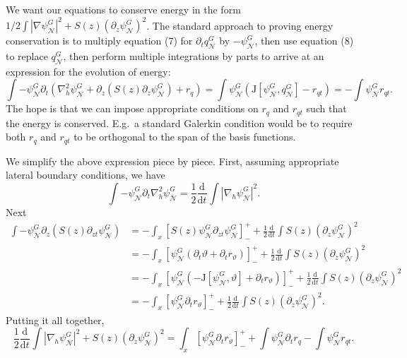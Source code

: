 \documentclass[10pt]{article}
\newcommand{\pd}[1]{\partial_{#1}}
\newcommand{\dd}[3]{\frac{\text{d}^{#3}#1}{\text{d}#2^{#3}}}
\newcommand{\tJ}{\text{J}}
\newcommand{\sN}{\mathcal{N}}
\begin{document}
\clearpage
We want our equations to conserve energy in the form $1/2\int |\nabla\psi_\sN^G|^2+S(z)(\pd{z}\psi_\sN^G)^2$.
The standard approach to proving energy conservation is to multiply equation (7) for $\pd{t}q_\sN^G$ by $-\psi_\sN^G$, then use equation (8) to replace $q_\sN^G$, then perform multiple integrations by parts to arrive at an expression for the evolution of energy:
\[\int-\psi_\sN^G\pd{t}\left(\nabla_h^2\psi_\sN^G + \pd{z}\left(S(z)\pd{z}\psi_\sN^G\right) + r_q\right) = \int\psi_\sN^G(\tJ[\psi_\sN^G,q_\sN^G] - r_{qt}) = -\int\psi_\sN^Gr_{qt}.\]
The hope is that we can impose appropriate conditions on $r_q$ and $r_{qt}$ such that the energy is conserved.
E.g.~a standard Galerkin condition would be to require both $r_q$ and $r_{qt}$ to be orthogonal to the span of the basis functions.

We simplify the above expression piece by piece.
First, assuming appropriate lateral boundary conditions, we have
\[\int -\psi_\sN^G\pd{t}\nabla_h^2\psi_\sN^G = \frac{1}{2}\dd{}{t}{}\int|\nabla_h\psi_\sN^G|^2.\]
Next
\begin{align}
\int-\psi_\sN^G\pd{z}\left(S(z)\pd{zt}\psi_\sN^G\right) &= -\int_x\left[S(z)\psi_\sN^G\pd{zt}\psi_\sN^G\right]_-^+ + \frac{1}{2}\dd{}{t}{}\int S(z)\left(\pd{z}\psi_\sN^G\right)^2\\
&=  -\int_x\left[\psi_\sN^G(\pd{t}\vartheta+\pd{t}r_\vartheta)\right]_-^+ + \frac{1}{2}\dd{}{t}{}\int S(z)\left(\pd{z}\psi_\sN^G\right)^2\\
&=  -\int_x\left[\psi_\sN^G(-\tJ[\psi_\sN^G,\vartheta]+\pd{t}r_\vartheta)\right]_-^+ + \frac{1}{2}\dd{}{t}{}\int S(z)\left(\pd{z}\psi_\sN^G\right)^2\\
&=-\int_x\left[\psi_\sN^G\pd{t}r_\vartheta\right]_-^++ \frac{1}{2}\dd{}{t}{}\int S(z)\left(\pd{z}\psi_\sN^G\right)^2.
\end{align}
Putting it all together,
\[\frac{1}{2}\dd{}{t}{}\int |\nabla_h\psi_\sN^G|^2 + S(z)\left(\pd{z}\psi_\sN^G\right)^2 =\int_x\left[\psi_\sN^G\pd{t}r_\vartheta\right]_-^++ \int\psi_\sN^G\pd{t}r_q-\int\psi_\sN^Gr_{qt}.\]
\end{document}
